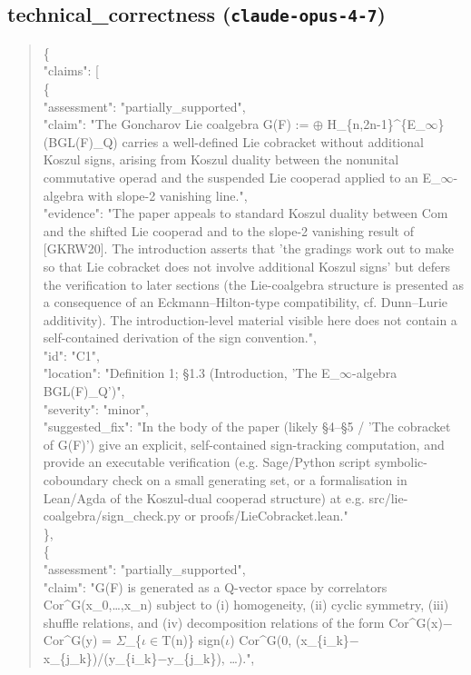 \documentclass[11pt]{article}
\begin{document}
\subsection*{technical\_correctness (\texttt{claude-opus-4-7})}
\begin{quote}\small\ttfamily\raggedright
\{\\
  "claims": [\\
    \{\\
      "assessment": "partially\_supported",\\
      "claim": "The Goncharov Lie coalgebra G(F) := \ensuremath{\oplus} H\_\{n,2n-1\}\^{}\{E\_\ensuremath{\infty}\}(BGL(F)\_Q) carries a well-defined Lie cobracket without additional Koszul signs, arising from Koszul duality between the nonunital commutative operad and the suspended Lie cooperad applied to an E\_\ensuremath{\infty}-algebra with slope-2 vanishing line.",\\
      "evidence": "The paper appeals to standard Koszul duality between Com and the shifted Lie cooperad and to the slope-2 vanishing result of [GKRW20]. The introduction asserts that 'the gradings work out to make so that Lie cobracket does not involve additional Koszul signs' but defers the verification to later sections (the Lie-coalgebra structure is presented as a consequence of an Eckmann--Hilton-type compatibility, cf. Dunn--Lurie additivity). The introduction-level material visible here does not contain a self-contained derivation of the sign convention.",\\
      "id": "C1",\\
      "location": "Definition 1; §1.3 (Introduction, 'The E\_\ensuremath{\infty}-algebra BGL(F)\_Q')",\\
      "severity": "minor",\\
      "suggested\_fix": "In the body of the paper (likely §4--§5 / 'The cobracket of G(F)') give an explicit, self-contained sign-tracking computation, and provide an executable verification (e.g. Sage/Python script symbolic-coboundary check on a small generating set, or a formalisation in Lean/Agda of the Koszul-dual cooperad structure) at e.g. src/lie-coalgebra/sign\_check.py or proofs/LieCobracket.lean."\\
    \},\\
    \{\\
      "assessment": "partially\_supported",\\
      "claim": "G(F) is generated as a Q-vector space by correlators Cor\^{}G(x\_0,…,x\_n) subject to (i) homogeneity, (ii) cyclic symmetry, (iii) shuffle relations, and (iv) decomposition relations of the form Cor\^{}G(x)\ensuremath{-}Cor\^{}G(y) = \ensuremath{\Sigma}\_\{\ensuremath{\iota}\ensuremath{\in}T(n)\} sign(\ensuremath{\iota}) Cor\^{}G(0, (x\_\{i\_k\}\ensuremath{-}x\_\{j\_k\})/(y\_\{i\_k\}\ensuremath{-}y\_\{j\_k\}), …).",\\

\end{quote}
\end{document}
